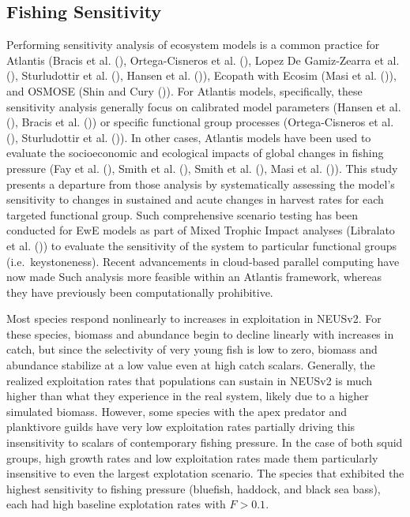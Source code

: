 \documentclass[
]{article}
\begin{document}
\subsection{Fishing Sensitivity}\label{fishing-sensitivity}

Performing sensitivity analysis of ecosystem models is a common practice for Atlantis (Bracis et al. (), Ortega-Cisneros et al. (), Lopez De Gamiz-Zearra et al. (), Sturludottir et al. (), Hansen et al. ()), Ecopath with Ecosim (Masi et al. ()), and OSMOSE (Shin and Cury ()). For Atlantis models, specifically, these sensitivity analysis generally focus on calibrated model parameters (Hansen et al. (), Bracis et al. ()) or specific functional group processes (Ortega-Cisneros et al. (), Sturludottir et al. ()). In other cases, Atlantis models have been used to evaluate the socioeconomic and ecological impacts of global changes in fishing pressure (Fay et al. (), Smith et al. (), Smith et al. (), Masi et al. ()). This study presents a departure from those analysis by systematically assessing the model's sensitivity to changes in sustained and acute changes in harvest rates for each targeted functional group. Such comprehensive scenario testing has been conducted for EwE models as part of Mixed Trophic Impact analyses (Libralato et al. ()) to evaluate the sensitivity of the system to particular functional groups (i.e.~keystoneness). Recent advancements in cloud-based parallel computing have now made Such analysis more feasible within an Atlantis framework, whereas they have previously been computationally prohibitive.

Most species respond nonlinearly to increases in exploitation in NEUSv2. For these species, biomass and abundance begin to decline linearly with increases in catch, but since the selectivity of very young fish is low to zero, biomass and abundance stabilize at a low value even at high catch scalars. Generally, the realized exploitation rates that populations can sustain in NEUSv2 is much higher than what they experience in the real system, likely due to a higher simulated biomass. However, some species with the apex predator and planktivore guilds have very low exploitation rates partially driving this insensitivity to scalars of contemporary fishing pressure. In the case of both squid groups, high growth rates and low exploitation rates made them particularly insensitive to even the largest explotation scenario. The species that exhibited the highest sensitivity to fishing pressure (bluefish, haddock, and black sea bass), each had high baseline explotation rates with \(F>0.1\).
\end{document}
